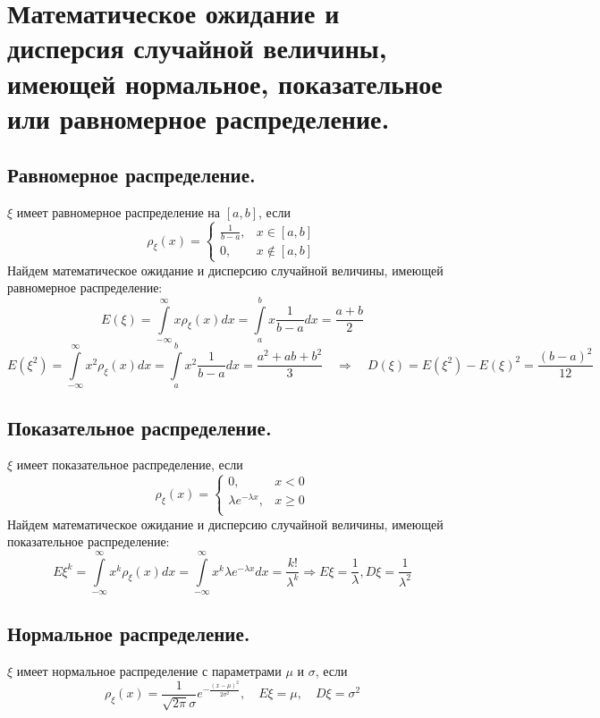 \section{Математическое ожидание и дисперсия случайной величины, имеющей нормальное, показательное или равномерное распределение.}

\subsection{Равномерное распределение.}
$\xi$ имеет равномерное распределение на $[a,b]$, если
\[
    \rho_\xi(x) = \begin{cases}
        \frac{1}{b - a}, & x \in [a,b] \\
        0, & x \notin [a,b]
    \end{cases}
\]
Найдем математическое ожидание и дисперсию случайной величины, имеющей равномерное распределение:
\[
    E(\xi) = \int \limits_{-\infty}^{\infty} x \rho_\xi(x) dx =
    \int \limits_{a}^{b} x \frac{1}{b - a} dx =
    \frac{a + b}{2}
\]
\[
    E(\xi^2) = \int \limits_{-\infty}^{\infty} x^2 \rho_\xi(x) dx =
    \int \limits_{a}^{b} x^2 \frac{1}{b - a} dx =
    \frac{a^2 + ab + b^2}{3}
    \quad \Rightarrow \quad
    D(\xi) = E(\xi^2) - E(\xi)^2 = \frac{(b-a)^2}{12}
\]
\subsection{Показательное распределение.}
$\xi$ имеет показательное распределение, если
\[
    \rho_\xi(x) = \begin{cases}
        0, & x < 0 \\
        \lambda e^{-\lambda x}, & x \geqslant 0 \\
    \end{cases}
\]
Найдем математическое ожидание и дисперсию случайной величины, имеющей показательное распределение:
\[
    E \xi^k = \int \limits_{-\infty}^{\infty} x^k \rho_\xi(x) dx =
    \int \limits_{-\infty}^{\infty} x^k \lambda e^{-\lambda x} dx = \frac{k!}{\lambda^k}
    \Rightarrow
    E \xi = \frac{1}{\lambda},
    D \xi = \frac{1}{\lambda^2}
\]

\subsection{Нормальное распределение.}
$\xi$ имеет нормальное распределение с параметрами $\mu$ и $\sigma$, если
\[
    \rho_\xi(x) = \frac{1}{\sqrt{2\pi} \sigma} e^{-\frac{(x - \mu)^2}{2 \sigma^2}},
    \quad E \xi = \mu, \quad D \xi = \sigma^2
\]